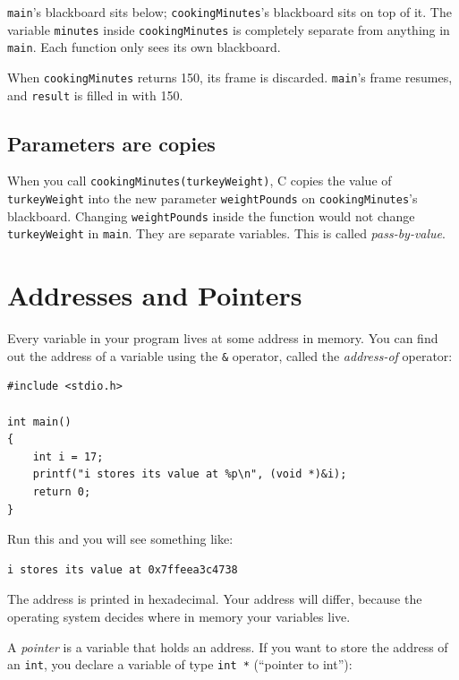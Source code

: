 \texttt{main}'s blackboard sits below; \texttt{cookingMinutes}'s
blackboard sits on top of it.  The variable \texttt{minutes} inside
\texttt{cookingMinutes} is completely separate from anything in
\texttt{main}.  Each function only sees its own blackboard.

When \texttt{cookingMinutes} returns 150, its frame is discarded.
\texttt{main}'s frame resumes, and \texttt{result} is filled in with 150.

\subsection{Parameters are copies}

When you call \texttt{cookingMinutes(turkeyWeight)}, C copies the
value of \texttt{turkeyWeight} into the new parameter
\texttt{weightPounds} on \texttt{cookingMinutes}'s blackboard.
Changing \texttt{weightPounds} inside the function would not change
\texttt{turkeyWeight} in \texttt{main}.  They are separate variables.
This is called \emph{pass-by-value}.

\section{Addresses and Pointers}

Every variable in your program lives at some address in memory.  You
can find out the address of a variable using the \texttt{\&} operator,
called the \emph{address-of} operator:

\begin{verbatim}
#include <stdio.h>

int main()
{
    int i = 17;
    printf("i stores its value at %p\n", (void *)&i);
    return 0;
}
\end{verbatim}

Run this and you will see something like:

\begin{verbatim}
i stores its value at 0x7ffeea3c4738
\end{verbatim}

The address is printed in hexadecimal.  Your address will differ, because
the operating system decides where in memory your variables live.

A \emph{pointer} is a variable that holds an address.
If you want to store the address of an \texttt{int}, you declare a
variable of type \texttt{int *} (``pointer to int''):

